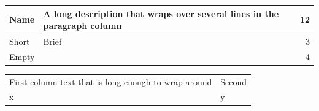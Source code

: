 \documentclass{article}
\begin{document}
\begin{tabular}{|l|p{3cm}|r|}
\hline
Name & A long description that wraps over several lines in the paragraph column & 12 \\
\hline
Short & Brief & 3 \\
Empty &  & 4 \\
\hline
\end{tabular}

\begin{tabular}{@{}p{}p{2.5cm}@{}}
First column text that is long enough to wrap around & Second \\[4pt]
x & y
\end{tabular}
\end{document}
